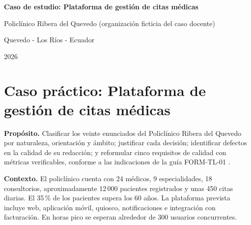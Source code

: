 \documentclass[12pt,a4paper]{article}
\begin{document}
\begin{titlepage}

    \vspace{0.5cm}

    {\large\bfseries Caso de estudio: Plataforma de gestión de citas médicas\par}
    \vspace{0.2cm}
    {\normalsize Policlínico Ribera del Quevedo
    (organización ficticia del caso docente)\par}


    \vfill
    {\small Quevedo - Los Ríos - Ecuador \par}
    {\small 2026 \par}
\end{titlepage}

\newpage


\section*{Caso práctico: Plataforma de gestión de citas médicas}

\textbf{Propósito.} Clasificar los veinte enunciados del Policlínico Ribera del Quevedo por naturaleza, orientación y ámbito; justificar cada decisión; identificar defectos en la calidad de su redacción; y reformular cinco requisitos de calidad con métricas verificables, conforme a las indicaciones de la guía FORM-TL-01 \cite{guia,iso29148}.

\textbf{Contexto.} El policlínico cuenta con 24 médicos, 9 especialidades, 18 consultorios, aproximadamente 12\,000 pacientes registrados y unas 450 citas diarias. El 35\,\% de los pacientes supera los 60 años. La plataforma prevista incluye web, aplicación móvil, quiosco, notificaciones e integración con facturación. En horas pico se esperan alrededor de 300 usuarios concurrentes.
\end{document}
